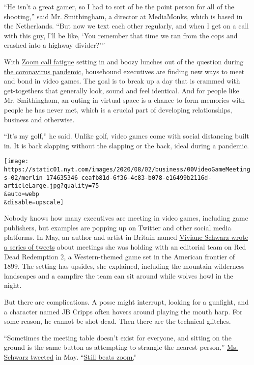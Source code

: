 ``He isn't a great gamer, so I had to sort of be the point person for
all of the shooting,'' said Mr. Smithingham, a director at MediaMonks,
which is based in the Netherlands. ``But now we text each other
regularly, and when I get on a call with this guy, I'll be like, `You
remember that time we ran from the cops and crashed into a highway
divider?'''

With
\href{https://www.nytimes.com/2020/05/20/smarter-living/coronavirus-zoom-facetime-fatigue.html}{Zoom
call fatigue} setting in and boozy lunches out of the question during
\href{https://www.nytimes.com/news-event/coronavirus}{the coronavirus
pandemic}, housebound executives are finding new ways to meet and bond
in video games. The goal is to break up a day that is crammed with
get-togethers that generally look, sound and feel identical. And for
people like Mr. Smithingham, an outing in virtual space is a chance to
form memories with people he has never met, which is a crucial part of
developing relationships, business and otherwise.

``It's my golf,'' he said. Unlike golf, video games come with social
distancing built in. It is back slapping without the slapping or the
back, ideal during a pandemic.

\texttt{[image: https://static01.nyt.com/images/2020/08/02/business/00VideoGameMeetings-02/merlin\_174635346\_ceafb81d-6f36-4c83-b078-e16499b2116d-articleLarge.jpg?quality=75\\\&auto=webp\\\&disable=upscale]}

Nobody knows how many executives are meeting in video games, including
game publishers, but examples are popping up on Twitter and other social
media platforms. In May, an author and artist in Britain named
\href{https://twitter.com/vivschwarz/status/1261575801008504832}{Viviane
Schwarz wrote a series of tweets} about meetings she was holding with an
editorial team on Red Dead Redemption 2, a Western-themed game set in
the American frontier of 1899. The setting has upsides, she explained,
including the mountain wilderness landscapes and a campfire the team can
sit around while wolves howl in the night.

But there are complications. A posse might interrupt, looking for a
gunfight, and a character named JB Cripps often hovers around playing
the mouth harp. For some reason, he cannot be shot dead. Then there are
the technical glitches.

``Sometimes the meeting table doesn't exist for everyone, and sitting on
the ground is the same button as attempting to strangle the nearest
person,''
\href{https://twitter.com/vivschwarz/status/1261577497105358848}{Ms.
Schwarz tweeted} in May.
``\href{https://www.nytimes.com/2020/06/29/business/zoom-shirt.html}{Still
beats zoom.}''

